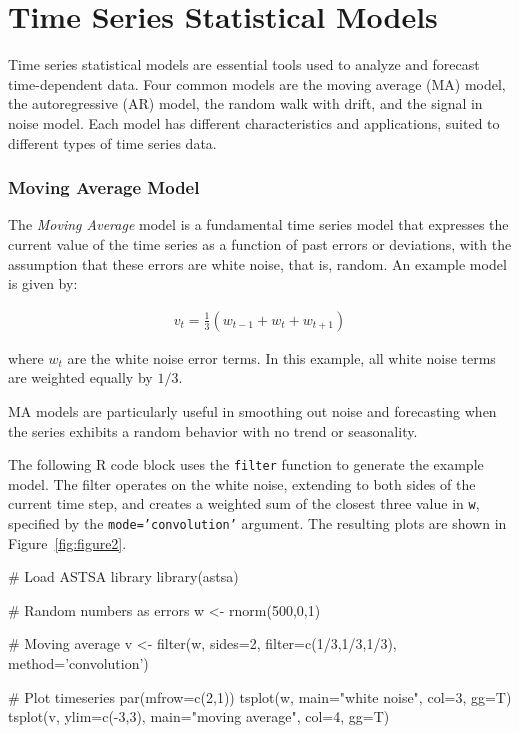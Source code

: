\section{Time Series Statistical Models}

Time series statistical models are essential tools used to analyze and forecast time-dependent data. Four common models are the moving average (MA) model, the autoregressive (AR) model, the random walk with drift, and the signal in noise model. Each model has different characteristics and applications, suited to different types of time series data.

\subsubsection*{Moving Average Model}

The \emph{Moving Average} model is a fundamental time series model that expresses the current value of the time series as a function of past errors or deviations, with the assumption that these errors are white noise, that is, random. An example model is given by: 

\begin{align*}v_t = \frac{1}{3} ( w_{t-1} + w_t + w_{t+1})
\end{align*}

\noindent where $w_t$ are the white noise error terms. In this example, all white noise terms are weighted equally by $1/3$.

MA models are particularly useful in smoothing out noise and forecasting when the series exhibits a random behavior with no trend or seasonality.

The following R code block uses the \texttt{filter} function to generate the example model. The filter operates on the white noise, extending to both sides of the current time step, and creates a weighted sum of the closest three value in \texttt{w}, specified by the \texttt{mode='convolution'} argument. The resulting plots are shown in Figure~\ref{fig:figure2}. 

\begin{samepage}
\begin{Rcode}
# Load ASTSA library
library(astsa)

# Random numbers as errors
w <- rnorm(500,0,1)

# Moving average
v <- filter(w, sides=2, filter=c(1/3,1/3,1/3), method='convolution')

# Plot timeseries
par(mfrow=c(2,1))
tsplot(w, main="white noise", col=3, gg=T)
tsplot(v, ylim=c(-3,3), main="moving average", col=4, gg=T)
\end{Rcode}
\end{samepage}


